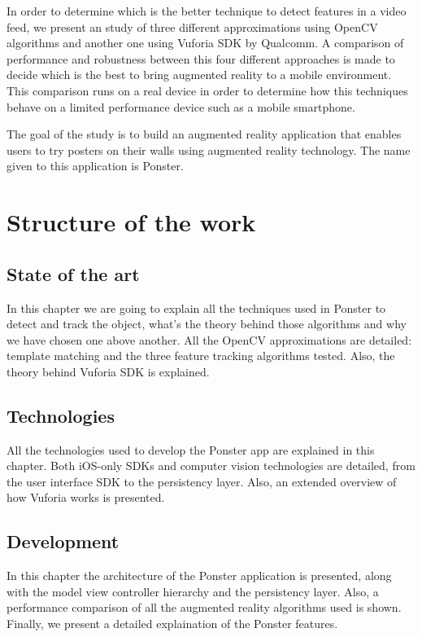 In order to determine which is the better technique to detect features in a
video feed, we present
an study of three different approximations using OpenCV algorithms and another one
using Vuforia SDK by Qualcomm\textregistered. A comparison of performance and
robustness between this four different approaches is made to decide which is the
best to bring augmented reality to a mobile environment. This comparison runs
on a real device in order to determine how this techniques behave on a limited
performance device such as a mobile smartphone.

The goal of the study is to build an augmented reality application that enables 
users to try posters on their walls using augmented reality technology. The
name given to this application is Ponster.

\section*{Structure of the work}
\subsection*{State of the art}
In this chapter we are going to explain all the techniques used in Ponster to
detect and track the object, what's the theory behind those algorithms and why
we have chosen one above another. All the OpenCV approximations are detailed:
template matching and the three feature tracking algorithms tested. Also, the
theory behind Vuforia SDK is explained.

\subsection*{Technologies}
All the technologies used to develop the Ponster app are explained in this
chapter. Both iOS-only SDKs and computer vision technologies are detailed,
from the user interface SDK to the persistency layer. Also, an extended
overview of how Vuforia works is presented.

\subsection*{Development}
In this chapter the architecture of the Ponster application is presented, along
with the model view controller hierarchy and the persistency layer. Also, a
performance comparison of all the augmented reality algorithms used is
shown. Finally, we present a detailed explaination of the Ponster features.

